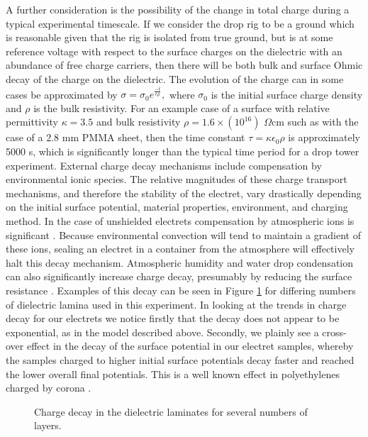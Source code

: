 \documentclass[12pt,a4paper,oneside]{book}
\begin{document}
A further consideration is the possibility of the change in total charge during a typical experimental timescale. If we consider the drop rig to be a ground which is reasonable given that the rig is isolated from true ground, but is at some reference voltage with respect to the surface charges on the dielectric with an abundance of free charge carriers, then there will be both bulk and surface Ohmic decay of the charge on the dielectric. The evolution of the charge can in some cases be approximated by $\sigma = \sigma_0 e^{\frac{-t}{\epsilon \rho}}, $ where $\sigma_0$ is the initial surface charge density and $\rho$ is the bulk resistivity. For an example case of a surface with relative permittivity $\kappa = 3.5$ and bulk resistivity $\rho = 1.6 \times (10^{16})$ $\Omega$cm such as with the case of a 2.8 mm PMMA sheet, then the time constant $\tau = \kappa \epsilon_0 \rho$ is approximately 5000 s, which is significantly longer than the typical time period for a drop tower experiment. External charge decay mechanisms include compensation by environmental ionic species. The relative magnitudes of these charge transport mechanisms, and therefore the stability of the electret, vary drastically depending on the initial surface potential, material properties, environment, and charging method. In the case of unshielded electrets compensation by atmospheric ions is significant \cite{perlman_electrets_1973}. Because environmental convection will tend to  maintain a gradient of these ions, sealing an electret in a container from the atmosphere will effectively halt this decay mechanism. Atmospheric humidity and water drop condensation can also significantly increase charge decay, presumably by reducing the surface resistance \cite{haenen_characteristic_1975}. Examples of this decay can be seen in Figure \ref{fig:charge_decay} for differing numbers of dielectric lamina used in this experiment. In looking at the trends in charge decay for our electrets we notice firstly that the decay does not appear to be exponential, as in the model described above. Secondly, we plainly see a cross-over effect in the decay of the surface potential in our electret samples, whereby the samples charged to higher initial surface potentials decay faster and reached the lower overall final potentials. This is a well known effect in polyethylenes charged by corona \cite{ferreira_corona_1992}.
\begin{figure}[htb!]
    \centering
    {}
       \caption{Charge decay in the dielectric laminates for several numbers of layers.\label{fig:charge_decay}}
\end{figure}
\newpage
\end{document}
